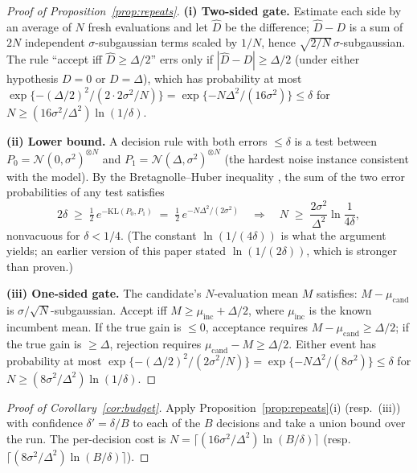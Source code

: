 \documentclass{article}
\theoremstyle{plain}
\theoremstyle{definition}
\theoremstyle{remark}
\begin{document}
\begin{proof}[Proof of Proposition~\ref{prop:repeats}]
\textbf{(i) Two-sided gate.} Estimate each side by an average of $N$ fresh evaluations and let $\widehat{D}$ be the difference; $\widehat{D} - D$ is a sum of $2N$ independent $\sigma$-subgaussian terms scaled by $1/N$, hence $\sqrt{2/N}\,\sigma$-subgaussian. The rule ``accept iff $\widehat{D} \ge \Delta/2$'' errs only if $|\widehat{D} - D| \ge \Delta/2$ (under either hypothesis $D = 0$ or $D = \Delta$), which has probability at most $\exp\{-(\Delta/2)^2 / (2 \cdot 2\sigma^2/N)\} = \exp\{-N\Delta^2/(16\sigma^2)\} \le \delta$ for $N \ge (16\sigma^2/\Delta^2)\ln(1/\delta)$.

\textbf{(ii) Lower bound.} A decision rule with both errors $\le \delta$ is a test between $P_0 = \mathcal{N}(0, \sigma^2)^{\otimes N}$ and $P_1 = \mathcal{N}(\Delta, \sigma^2)^{\otimes N}$ (the hardest noise instance consistent with the model). By the Bretagnolle--Huber inequality \citep{tsybakov2009introduction}, the sum of the two error probabilities of any test satisfies
\[
2\delta \;\ge\; \tfrac{1}{2}\, e^{-\mathrm{KL}(P_0, P_1)} \;=\; \tfrac{1}{2}\, e^{-N\Delta^2/(2\sigma^2)}
\quad\Longrightarrow\quad
N \;\ge\; \frac{2\sigma^2}{\Delta^2} \ln \frac{1}{4\delta},
\]
nonvacuous for $\delta < 1/4$. (The constant $\ln(1/(4\delta))$ is what the argument yields; an earlier version of this paper stated $\ln(1/(2\delta))$, which is stronger than proven.)

\textbf{(iii) One-sided gate.} The candidate's $N$-evaluation mean $M$ satisfies: $M - \mu_{\mathrm{cand}}$ is $\sigma/\sqrt{N}$-subgaussian. Accept iff $M \ge \mu_{\mathrm{inc}} + \Delta/2$, where $\mu_{\mathrm{inc}}$ is the known incumbent mean. If the true gain is $\le 0$, acceptance requires $M - \mu_{\mathrm{cand}} \ge \Delta/2$; if the true gain is $\ge \Delta$, rejection requires $\mu_{\mathrm{cand}} - M \ge \Delta/2$. Either event has probability at most $\exp\{-(\Delta/2)^2/(2\sigma^2/N)\} = \exp\{-N\Delta^2/(8\sigma^2)\} \le \delta$ for $N \ge (8\sigma^2/\Delta^2)\ln(1/\delta)$.
\end{proof}

\begin{proof}[Proof of Corollary~\ref{cor:budget}]
Apply Proposition~\ref{prop:repeats}(i) (resp.\ (iii)) with confidence $\delta' = \delta/B$ to each of the $B$ decisions and take a union bound over the run. The per-decision cost is $N = \lceil (16\sigma^2/\Delta^2) \ln(B/\delta) \rceil$ (resp.\ $\lceil (8\sigma^2/\Delta^2) \ln(B/\delta) \rceil$).
\end{proof}
\end{document}
